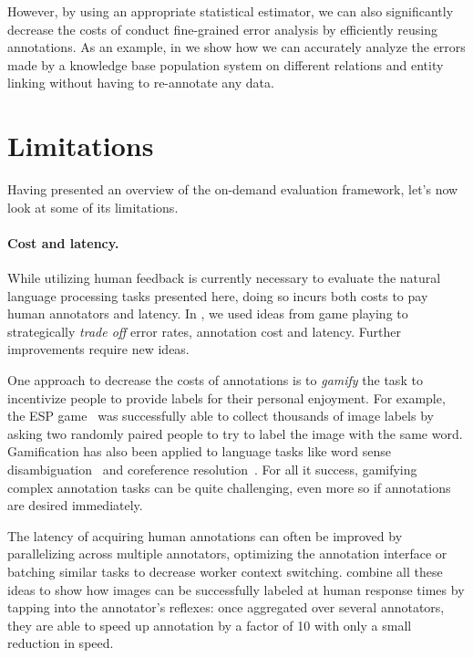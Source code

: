 However, by using an appropriate statistical estimator, we can also significantly decrease the costs of conduct fine-grained error analysis by efficiently reusing annotations.
As an example, in  we show how we can accurately analyze the errors made by a knowledge base population system on different relations and entity linking without having to re-annotate any data.

\section{Limitations}
Having presented an overview of the on-demand evaluation framework, let's now look at some of its limitations.

\paragraph{Cost and latency.}
While utilizing human feedback is currently necessary to evaluate the natural language processing tasks presented here,
  doing so incurs both costs to pay human annotators and latency.
In , we used ideas from game playing to strategically \textit{trade off} error rates, annotation cost and latency. 
Further improvements require new ideas.

One approach to decrease the costs of annotations is to \textit{gamify} the task to incentivize people to provide labels for their personal enjoyment.
For example, the ESP game~\citep{espgame} was successfully able to collect thousands of image labels by asking two randomly paired people to try to label the image with the same word.
Gamification has also been applied to language tasks like word sense disambiguation~\citep{davidjurgens} and coreference resolution~\citep{phrasedetectives}.
For all it success, gamifying complex annotation tasks can be quite challenging, even more so if annotations are desired immediately.

The latency of acquiring human annotations can often be improved by parallelizing across multiple annotators, optimizing the annotation interface  or batching similar tasks to decrease worker context switching.
\citet{krishna2016embracing} combine all these ideas to show how images can be successfully labeled at human response times by tapping into the annotator's reflexes: once aggregated over several annotators, they are able to speed up annotation by a factor of 10 with only a small reduction in speed.

